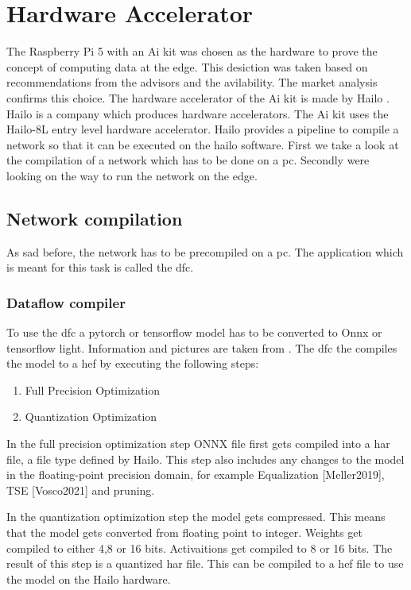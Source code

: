 \chapter{Hardware Accelerator}

The Raspberry Pi 5 with an Ai kit was chosen as the hardware to prove the concept of computing data at the edge.
This desiction was taken based on recommendations from the advisors and the avilability.
The market analysis confirms this choice.
The hardware accelerator of the Ai kit is made by Hailo \cite{hailo}.
Hailo is a company which produces hardware accelerators.
The Ai kit uses the Hailo-8L entry level hardware accelerator.
Hailo provides a pipeline to compile a network so that it can be executed on the hailo software.
First we take a look at the compilation of a network which has to be done on a pc.
Secondly were looking on the way to run the network on the edge.

\section{Network compilation}
As sad before, the network has to be precompiled on a pc.
The application which is meant for this task is called the \Acrfull{dfc}.

\subsection{Dataflow compiler
\label{section:dfc}}

To use the \acrshort{dfc} a pytorch or tensorflow model has to be converted to Onnx or tensorflow light.
Information and pictures are taken from \cite{hailo_dataflow_compiler}.
The \acrshort{dfc} the compiles the model to a \Acrfull{hef} by executing the following steps:

\begin{enumerate}
    \item Full Precision Optimization
    \item Quantization Optimization
\end{enumerate}
In the full precision optimization step ONNX file first gets compiled into a \acrfull{har} file, a file type defined by Hailo.
This step also includes any changes to the model in the floating-point precision domain, for example Equalization [Meller2019], TSE [Vosco2021] and pruning.

In the quantization optimization step the model gets compressed.
This means that the model gets converted from floating point to integer.
Weights get compiled to either 4,8 or 16 bits.
Activaitions get compiled to 8 or 16 bits.
The result of this step is a quantized \acrshort{har} file.
This can be compiled to a \acrshort{hef} file to use the model on the Hailo hardware.


